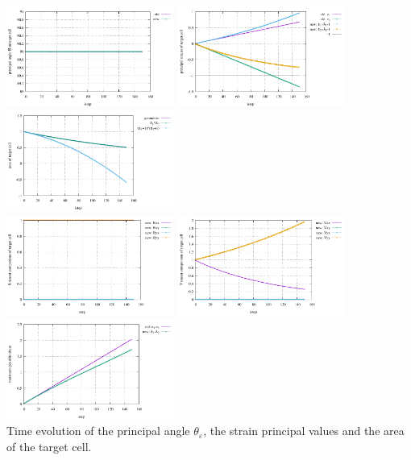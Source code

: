 \begin{center}
\includegraphics[width=5.5cm]{python_codes/fieldstone_89/results/biaxial/principal_angle.pdf}
\includegraphics[width=5.5cm]{python_codes/fieldstone_89/results/biaxial/principal_strains.pdf}
\includegraphics[width=5.5cm]{python_codes/fieldstone_89/results/biaxial/area.pdf}\\
\includegraphics[width=5.5cm]{python_codes/fieldstone_89/results/biaxial/R.pdf}
\includegraphics[width=5.5cm]{python_codes/fieldstone_89/results/biaxial/V.pdf}
\includegraphics[width=5.5cm]{python_codes/fieldstone_89/results/biaxial/maximum_shear.pdf}\\
{\captionfont Time evolution of the principal angle $\theta_\varepsilon$, 
the strain principal values and the area of the target cell.}
\end{center}












